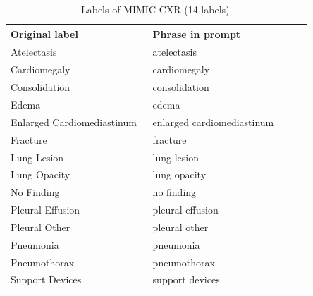 \begin{table}[htbp]
\centering
\small
\caption{Labels of MIMIC-CXR (14 labels).}\label{tab:labels_MIMIC}
\begin{tabular}{p{0.4\linewidth}p{0.45\linewidth}}
\toprule
Original label & Phrase in prompt \\
\midrule
Atelectasis & atelectasis \\
Cardiomegaly & cardiomegaly \\
Consolidation & consolidation \\
Edema & edema \\
Enlarged Cardiomediastinum & enlarged cardiomediastinum \\
Fracture & fracture \\
Lung Lesion & lung lesion \\
Lung Opacity & lung opacity \\
No Finding & no finding \\
Pleural Effusion & pleural effusion \\
Pleural Other & pleural other \\
Pneumonia & pneumonia \\
Pneumothorax & pneumothorax \\
Support Devices & support devices \\
\bottomrule
\end{tabular}
\end{table}

